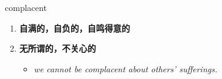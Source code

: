 
\begin{frame}
{\huge complacent}
\begin{center}
\begin{enumerate}\Large
  \item \textbf{自满的，自负的，自鸣得意的}
  \item \textbf{无所谓的，不关心的}
  \begin{itemize}
    \item \em{\Large{we cannot be complacent about others' sufferings.}}
  \end{itemize}
\end{enumerate}
\end{center}
\end{frame}
